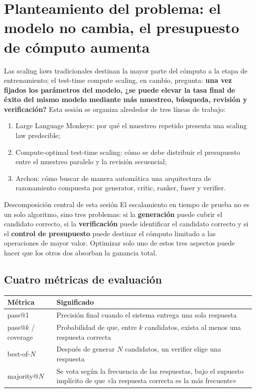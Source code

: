 \section{Planteamiento del problema: el modelo no cambia, el presupuesto de cómputo aumenta}

Las scaling laws tradicionales destinan la mayor parte del cómputo a la etapa de entrenamiento; el test-time compute scaling, en cambio, pregunta: \textbf{una vez fijados los parámetros del modelo, ¿se puede elevar la tasa final de éxito del mismo modelo mediante más muestreo, búsqueda, revisión y verificación?} Esta sesión se organiza alrededor de tres líneas de trabajo:

\begin{enumerate}
    \item Large Language Monkeys: por qué el muestreo repetido presenta una scaling law predecible;
    \item Compute-optimal test-time scaling: cómo se debe distribuir el presupuesto entre el muestreo paralelo y la revisión secuencial;
    \item Archon: cómo buscar de manera automática una arquitectura de razonamiento compuesta por generator, critic, ranker, fuser y verifier.
\end{enumerate}

\begin{importantbox}{Descomposición central de esta sesión}
El escalamiento en tiempo de prueba no es un solo algoritmo, sino tres problemas: si la \textbf{generación} puede cubrir el candidato correcto, si la \textbf{verificación} puede identificar el candidato correcto y si el \textbf{control de presupuesto} puede destinar el cómputo limitado a las operaciones de mayor valor. Optimizar solo uno de estos tres aspectos puede hacer que los otros dos absorban la ganancia total.
\end{importantbox}

\subsection{Cuatro métricas de evaluación}

\begin{table}[H]
\centering
\begin{tabular}{p{3.1cm}p{10.5cm}}
\toprule
\textbf{Métrica} & \textbf{Significado} \\
\midrule
pass@1 & Precisión final cuando el sistema entrega una sola respuesta \\
pass@$k$ / coverage & Probabilidad de que, entre $k$ candidatos, exista al menos una respuesta correcta \\
best-of-$N$ & Después de generar $N$ candidatos, un verifier elige una respuesta \\
majority@$N$ & Se vota según la frecuencia de las respuestas, bajo el supuesto implícito de que «la respuesta correcta es la más frecuente» \\
\bottomrule
\end{tabular}
\end{table}

